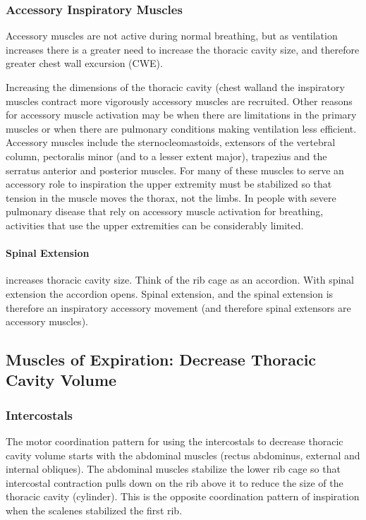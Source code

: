 \subsubsection{Accessory Inspiratory Muscles}
Accessory muscles are not active during normal breathing, but as ventilation increases there is a greater need to increase the thoracic cavity size, and therefore greater chest wall excursion (CWE). %

Increasing the dimensions of the thoracic cavity (chest walland the inspiratory muscles contract more vigorously accessory muscles are recruited. Other reasons for accessory muscle activation may be when there are limitations in the primary muscles or when there are pulmonary conditions making ventilation less efficient. Accessory muscles include the sternocleomastoids, extensors of the vertebral column, pectoralis minor (and to a lesser extent major), trapezius and the serratus anterior and posterior muscles. For many of these muscles to serve an accessory role to inspiration the upper extremity must be stabilized so that tension in the muscle moves the thorax, not the limbs. In people with severe pulmonary disease that rely on accessory muscle activation for breathing, activities that use the upper extremities can be considerably limited.

\paragraph{Spinal Extension} increases thoracic cavity size. Think of the rib cage as an accordion. With spinal extension the accordion opens. Spinal extension, and the spinal extension is therefore an inspiratory accessory movement (and therefore spinal extensors are accessory muscles).


\subsection{Muscles of Expiration: Decrease Thoracic Cavity Volume}

\subsubsection{Intercostals}

The motor coordination pattern for using the intercostals to decrease thoracic cavity volume starts with the abdominal muscles (rectus abdominus, external and internal obliques). The abdominal muscles stabilize the lower rib cage so that intercostal contraction pulls down on the rib above it to reduce the size of the thoracic cavity (cylinder). This is the opposite coordination pattern of inspiration when the scalenes stabilized the first rib. 

